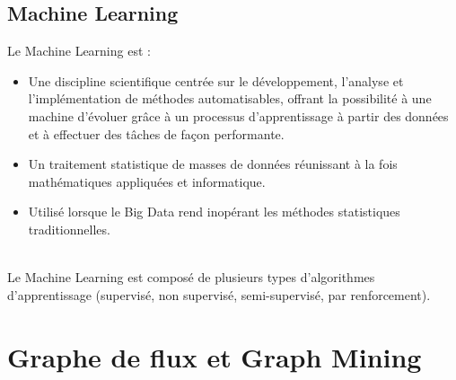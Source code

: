 	\subsection{Machine Learning}
	\begin{frame}
		\begin{block}{Le Machine Learning est :}
			\begin{itemize}	
				\pause \item Une discipline scientifique centrée sur le développement, l’analyse et l’implémentation de méthodes automatisables, offrant la possibilité à une machine d’évoluer grâce à un processus d’apprentissage à partir des données et à effectuer des tâches de façon performante.
				\pause\item Un traitement statistique de masses de données réunissant à la fois mathématiques appliquées et informatique.
				\pause\item Utilisé lorsque le Big Data rend inopérant les méthodes statistiques traditionnelles.
			\end{itemize}
		\end{block}
		~\\
		\pause
		Le Machine Learning est composé de plusieurs types d'algorithmes d’apprentissage (supervisé, non supervisé, semi-supervisé, par renforcement).
	\end{frame}
	
	\section{Graphe de flux et Graph Mining}
